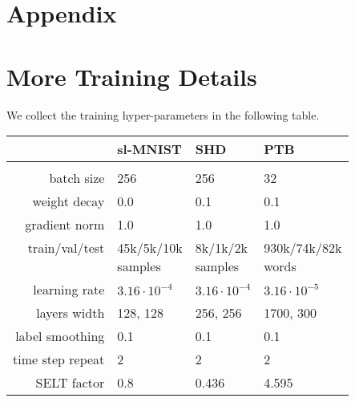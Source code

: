 \clearpage
\renewcommand{\thesection}{\Alph{section}}
\renewcommand{\theHsection}{A\arabic{section}}

\beginsupplement



\section*{Appendix}

\section{More Training Details}
\label{app:trainingdetails}

We collect the training hyper-parameters in the following table.

\begin{table}[h]
\centering
\begin{tabular}{rlll}
& sl-MNIST & SHD &  PTB \\ \hline
\\
batch size & 256 & 256 & 32 \\
weight decay &0.0 & 0.1 &  0.1 \\
gradient norm & 1.0 & 1.0 & 1.0 \\
\shortstack{train/val/test \\ \ } & \shortstack{45k/5k/10k\\ samples } & \shortstack{8k/1k/2k \\ samples }  &   \shortstack{930k/74k/82k \\ words} \\
learning rate & $3.16 \cdot 10^{-4}$ &  $3.16 \cdot 10^{-4}$ &  $3.16 \cdot 10^{-5}$ \\
layers width & 128, 128 & 256, 256 &  1700, 300 \\
label smoothing & 0.1 & 0.1 & 0.1 \\
time step repeat & 2 & 2 & 2 \\
SELT factor & 0.8 & 0.436 & 4.595 \\
\end{tabular}
\end{table}


